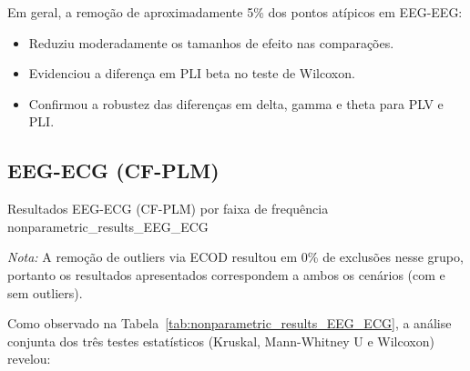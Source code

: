Em geral, a remoção de aproximadamente 5\% dos pontos atípicos em EEG-EEG:
\begin{itemize}
  \item Reduziu moderadamente os tamanhos de efeito nas comparações.
  \item Evidenciou a diferença em PLI beta no teste de Wilcoxon.
  \item Confirmou a robustez das diferenças em delta, gamma e theta para PLV e PLI.
\end{itemize}

\clearpage
\subsection{EEG-ECG (CF-PLM)}

{Resultados EEG-ECG (CF-PLM) por faixa de frequência}
{nonparametric_results_EEG_ECG}

\noindent\emph{Nota:} A remoção de outliers via ECOD resultou em 0\% de exclusões nesse grupo, portanto os resultados apresentados correspondem a ambos os cenários (com e sem outliers).  

Como observado na Tabela~\ref{tab:nonparametric_results_EEG_ECG}, a análise conjunta dos três testes estatísticos (Kruskal, Mann-Whitney U e Wilcoxon) revelou:


